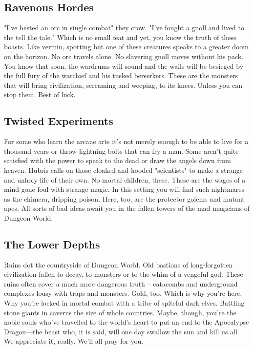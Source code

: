  
\subsection{Ravenous Hordes}    
 

"I've bested an orc in single combat" they crow. "I've fought a gnoll and lived to the tell the tale." Which is no small feat and yet, you know the truth of these boasts. Like vermin, spotting but one of these creatures speaks to a greater doom on the horizon. No orc travels alone. No slavering gnoll moves without his pack. You know that soon, the wardrums will sound and the walls will be besieged by the full fury of the warchief and his tusked berserkers. These are the monsters that will bring civilization, screaming and weeping, to its knees. Unless you can stop them. Best of luck.

 
\subsection{Twisted Experiments}    
 

For some who learn the arcane arts it's not merely enough to be able to live for a thousand years or throw lightning bolts that can fry a man. Some aren't quite satisfied with the power to speak to the dead or draw the angels down from heaven. Hubris calls on those cloaked-and-hooded "scientists" to make a strange and unholy life of their own. No mortal children, these. These are the wages of a mind gone foul with strange magic. In this setting you will find such nightmares as the chimera, dripping poison. Here, too, are the protector golems and mutant apes. All sorts of bad ideas await you in the fallen towers of the mad magicians of Dungeon World.

 
\subsection{The Lower Depths}   
 

Ruins dot the countryside of Dungeon World. Old bastions of long-forgotten civilization fallen to decay, to monsters or to the whim of a vengeful god. These ruins often cover a much more dangerous truth – catacombs and underground complexes lousy with traps and monsters. Gold, too. Which is why you're here. Why you're locked in mortal combat with a tribe of spiteful dark elves. Battling stone giants in caverns the size of whole countries. Maybe, though, you're the noble souls who've travelled to the world's heart to put an end to the Apocalypse Dragon—the beast who, it is said, will one day swallow the sun and kill us all. We appreciate it, really. We'll all pray for you.

